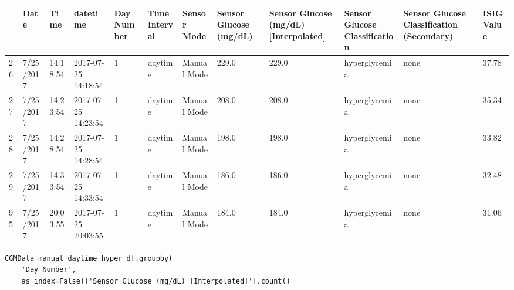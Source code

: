 \bigskip\noindent
\begin{tabular}{p{}p{}p{}p{}p{}p{}p{}p{}p{}p{}p{}p{}}
\toprule
 & Date & Time & datetime & Day Number & Time Interval & Sensor Mode & Sensor Glucose (mg/dL) & Sensor Glucose (mg/dL) [Interpolated] & Sensor Glucose Classification & Sensor Glucose Classification (Secondary) & ISIG Value \\
\hline
26 & 7/25/2017 & 14:18:54 & 2017-07-25 14:18:54 & 1 & daytime & Manual Mode & 229.0 & 229.0 & hyperglycemia & none & 37.78 \\
\hline
27 & 7/25/2017 & 14:23:54 & 2017-07-25 14:23:54 & 1 & daytime & Manual Mode & 208.0 & 208.0 & hyperglycemia & none & 35.34 \\
\hline
28 & 7/25/2017 & 14:28:54 & 2017-07-25 14:28:54 & 1 & daytime & Manual Mode & 198.0 & 198.0 & hyperglycemia & none & 33.82 \\
\hline
29 & 7/25/2017 & 14:33:54 & 2017-07-25 14:33:54 & 1 & daytime & Manual Mode & 186.0 & 186.0 & hyperglycemia & none & 32.48 \\
\hline
95 & 7/25/2017 & 20:03:55 & 2017-07-25 20:03:55 & 1 & daytime & Manual Mode & 184.0 & 184.0 & hyperglycemia & none & 31.06 \\
\hline
\bottomrule
\end{tabular}

\bigskip

\begin{verbatim}
CGMData_manual_daytime_hyper_df.groupby(
    'Day Number', 
    as_index=False)['Sensor Glucose (mg/dL) [Interpolated]'].count()
\end{verbatim}

